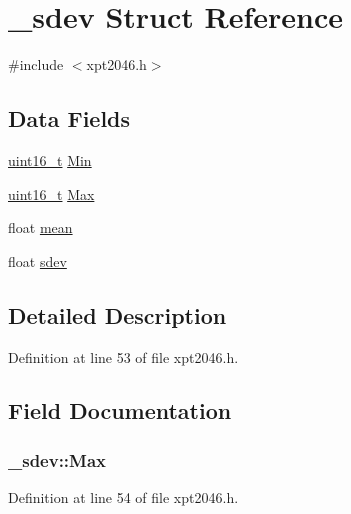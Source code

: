 \hypertarget{struct__sdev}{}\section{\+\_\+sdev Struct Reference}
\label{struct__sdev}


{\ttfamily \#include $<$xpt2046.\+h$>$}

\subsection*{Data Fields}
\begin{DoxyCompactItemize}
\item 
\hyperlink{send_8c_a273cf69d639a59973b6019625df33e30}{uint16\+\_\+t} \hyperlink{struct__sdev_ad496630f4d9975834148dcff8e2475c6}{Min}
\item 
\hyperlink{send_8c_a273cf69d639a59973b6019625df33e30}{uint16\+\_\+t} \hyperlink{struct__sdev_a72bab17004f1930230095b909e87c84f}{Max}
\item 
float \hyperlink{struct__sdev_a2bd0cf80fd334fabaac9100a2538bcb5}{mean}
\item 
float \hyperlink{struct__sdev_a053a14f9e4bd729ce23aafdb1e69e48a}{sdev}
\end{DoxyCompactItemize}


\subsection{Detailed Description}


Definition at line 53 of file xpt2046.\+h.



\subsection{Field Documentation}
\subsubsection[{\texorpdfstring{Max}{Max}}]{ \+\_\+sdev\+::\+Max}\hypertarget{struct__sdev_a72bab17004f1930230095b909e87c84f}{}\label{struct__sdev_a72bab17004f1930230095b909e87c84f}


Definition at line 54 of file xpt2046.\+h.

